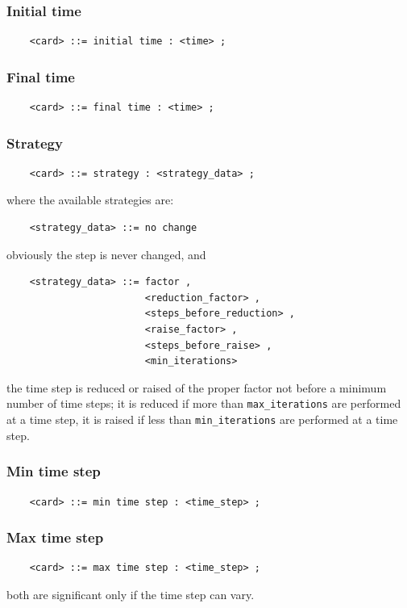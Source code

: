 \documentclass[10pt,dvips]{report}
\begin{document}
\subsubsection{Initial time}
\begin{verbatim}
    <card> ::= initial time : <time> ;
\end{verbatim}

\subsubsection{Final time}
\begin{verbatim}
    <card> ::= final time : <time> ;
\end{verbatim}

\subsubsection{Strategy}
\begin{verbatim}
    <card> ::= strategy : <strategy_data> ;
\end{verbatim}
where the available strategies are:
\begin{verbatim}
    <strategy_data> ::= no change 
\end{verbatim}
obviously the step is never changed, and
\begin{verbatim}
    <strategy_data> ::= factor , 
                        <reduction_factor> ,
                        <steps_before_reduction> ,
                        <raise_factor> ,
                        <steps_before_raise> ,
                        <min_iterations>
\end{verbatim}
the time step is reduced or raised of the proper factor not before a
minimum number of time steps; it is reduced if more than 
{\tt max\_iterations} are performed at a time step, it is raised if less
than {\tt min\_iterations} are performed at a time step.

\subsubsection{Min time step}
\begin{verbatim}
    <card> ::= min time step : <time_step> ;
\end{verbatim}

\subsubsection{Max time step}
\begin{verbatim}
    <card> ::= max time step : <time_step> ;
\end{verbatim}
both are significant only if the time step can vary.
\end{document}
